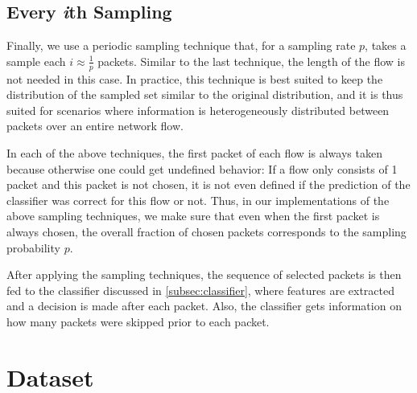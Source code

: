 \documentclass[conference]{IEEEtran}
\newcommand\note[2]{{\color{#1}#2}}
\begin{document}
\subsection{Every \emph{i}th Sampling}
Finally, we use a periodic sampling technique that, for a sampling rate $p$, takes a sample each $i \approx \frac{1}{p} $ packets. Similar to the last technique, the length of the flow is not needed in this case. In practice, this technique is best suited to keep the distribution of the sampled set similar to the original distribution, and it is thus suited for scenarios where information is heterogeneously distributed between packets over an entire network flow.

In each of the above techniques, the first packet of each flow is always taken because otherwise one could get undefined behavior: If a flow only consists of 1 packet and this packet is not chosen, it is not even defined if the prediction of the classifier was correct for this flow or not. Thus, in our implementations of the above sampling techniques, we make sure that even when the first packet is always chosen, the overall fraction of chosen packets corresponds to the sampling probability $p$.

After applying the sampling techniques, the sequence of selected packets is then fed to the classifier discussed in \autoref{subsec:classifier}, where features are extracted and a decision is made after each packet. Also, the classifier gets information on how many packets were skipped prior to each packet.


\section{Dataset}

\end{document}
